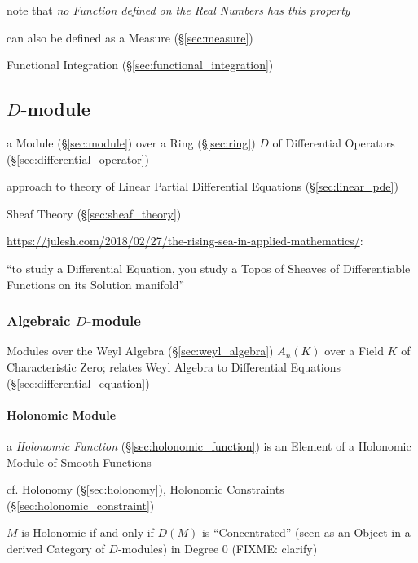 note that \emph{no Function defined on the Real Numbers has this property}

can also be defined as a Measure (\S\ref{sec:measure})

\fist Functional Integration (\S\ref{sec:functional_integration})



\subsection{$D$-module}\label{sec:d_module}

a Module (\S\ref{sec:module}) over a Ring (\S\ref{sec:ring}) $D$ of Differential
Operators (\S\ref{sec:differential_operator})

approach to theory of Linear Partial Differential Equations
(\S\ref{sec:linear_pde})

Sheaf Theory (\S\ref{sec:sheaf_theory})

\url{https://julesh.com/2018/02/27/the-rising-sea-in-applied-mathematics/}:

``to study a Differential Equation, you study a Topos of Sheaves of
Differentiable Functions on its Solution manifold''



\subsubsection{Algebraic $D$-module}\label{sec:algebraic_d_module}

Modules over the Weyl Algebra (\S\ref{sec:weyl_algebra}) $A_n(K)$ over a Field
$K$ of Characteristic Zero; relates Weyl Algebra to Differential Equations
(\S\ref{sec:differential_equation})



\paragraph{Holonomic Module}\label{sec:holonomic_module}\hfill

a \emph{Holonomic Function} (\S\ref{sec:holonomic_function}) is an Element of a
Holonomic Module of Smooth Functions

\fist cf. Holonomy (\S\ref{sec:holonomy}), Holonomic Constraints
(\S\ref{sec:holonomic_constraint})

$M$ is Holonomic if and only if $D(M)$ is ``Concentrated'' (seen as an Object
in a derived Category of $D$-modules) in Degree $0$ (FIXME: clarify)


